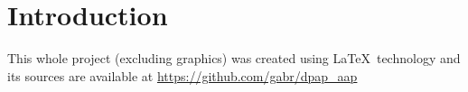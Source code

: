 \section{Introduction}


\begin{bottompar}
This whole project (excluding graphics) was created using \LaTeX \ technology and its sources are available at \url{https://github.com/gabr/dpap_aap}

\ 
\end{bottompar}